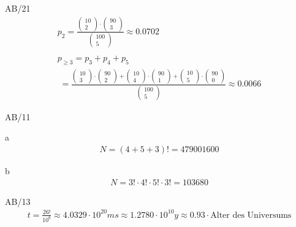 \begin{exercise}{AB/21}
  \begin{gather*}
    p_2 = \frac{\begin{pmatrix}10 \\ 2\end{pmatrix} \cdot \begin{pmatrix}90 \\ 3\end{pmatrix}}{\begin{pmatrix}100 \\ 5\end{pmatrix}} \approx 0.0702 \\\\
    p_{\geq 3} = p_3 + p_4 + p_5 \\
    \;= \frac{\begin{pmatrix}10 \\ 3\end{pmatrix} \cdot \begin{pmatrix}90 \\ 2\end{pmatrix} + \begin{pmatrix}10 \\ 4\end{pmatrix} \cdot \begin{pmatrix}90 \\ 1\end{pmatrix} + \begin{pmatrix}10 \\ 5\end{pmatrix} \cdot \begin{pmatrix}90 \\ 0\end{pmatrix}}{\begin{pmatrix}100 \\ 5\end{pmatrix}} \approx 0.0066
  \end{gather*}
\end{exercise}
\begin{exercise}{AB/11}
  \item [a]
  \begin{gather*}
    N = (4 + 5 + 3)! = 479001600
  \end{gather*}
  \item [b]
  \begin{gather*}
    N = 3! \cdot 4! \cdot 5! \cdot 3! = 103680
  \end{gather*}
\end{exercise}
\begin{exercise}{AB/13}
  \begin{gather*}
    t = \frac{26!}{10^6} \approx 4.0329 \cdot 10^{20}ms \approx 1.2780 \cdot 10^{10}y \approx 0.93 \cdot \text{Alter des Universums}
  \end{gather*}
\end{exercise}
